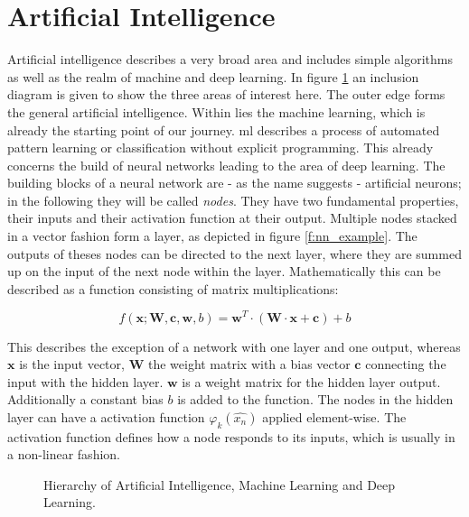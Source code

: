 \section{Artificial Intelligence}
Artificial intelligence describes a very broad area and includes simple algorithms as well as the realm of machine and deep learning. In figure \ref{f:ai_hierarchy} an inclusion diagram is given to show the three areas of interest here. The outer edge forms the general artificial intelligence. Within lies the machine learning, which is already the starting point of our journey. \ac{ml} describes a process of automated pattern learning or classification without explicit programming. This already concerns the build of neural networks leading to the area of deep learning. The building blocks of a neural network are - as the name suggests - artificial neurons; in the following they will be called \textit{nodes}. They have two fundamental properties, their inputs and their activation function at their output. Multiple nodes stacked in a vector fashion form a layer, as depicted in figure \ref{f:nn_example}. The outputs of theses nodes can be directed to the next layer, where they are summed up on the input of the next node within the layer. Mathematically this can be described as a function consisting of matrix multiplications:

\begin{equation}
f(\mathbf{x}; \mathbf{W}, \mathbf{c}, \mathbf{w}, b) = \mathbf{w}^T\cdot \left(\mathbf{W}\cdot \mathbf{x} + \mathbf{c} \right) + b
\end{equation}

This describes the exception of a network with one layer and one output, whereas $\mathbf{x}$ is the input vector, $\mathbf{W}$ the weight matrix with a bias vector $\mathbf{c}$ connecting the input with the hidden layer. $\mathbf{w}$ is a weight matrix for the hidden layer output. Additionally a constant bias $b$ is added to the function. The nodes in the hidden layer can have a activation function $\varphi_k(\hat{x_n})$ applied element-wise. The activation function defines how a node responds to its inputs, which is usually in a non-linear fashion.

\begin{figure}[htb]
\centering

\caption{Hierarchy of Artificial Intelligence, Machine Learning and Deep Learning.}
\label{f:ai_hierarchy}
\end{figure}

